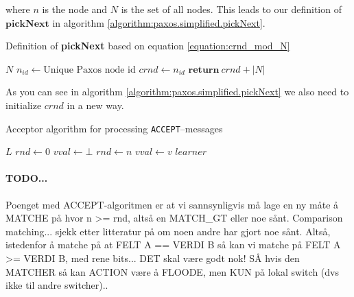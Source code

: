 where $n$ is the node and $N$ is the set of all nodes.  This leads to our
definition of $\textbf{pickNext}$ in algorithm
\ref{algorithm:paxos.simplified.pickNext}.

\begin{algorithm}
  \caption{Definition of \textbf{pickNext} based on equation \ref{equation:crnd_mod_N}}
  \label{algorithm:paxos.simplified.pickNext}
  \begin{algorithmic}
    \State $N$ 
    \State $n_{id} \gets \text{Unique Paxos node id}$
    \State $crnd \gets n_{id}$
    \State
      \State $\textbf{return}\ crnd + |N|$ 
    \EndFunction
  \end{algorithmic}
\end{algorithm}

As you can see in algorithm \ref{algorithm:paxos.simplified.pickNext} we
also need to initialize $crnd$ in a new way.

\begin{algorithm}
  \caption{Acceptor algorithm for processing \texttt{ACCEPT}--messages}
  \label{paxos.algorithm.acceptor}
  \begin{algorithmic}
    \State $L$
    \State $rnd \gets 0$ 
    \State $vval \gets \bot$ 
    \State
        \State $rnd\gets n$
        \State $vval\gets v$
           \State {}
                         {$learner$}
        \EndForIn
      \EndIf
    \EndOn
  \end{algorithmic}
\end{algorithm}

\paragraph{TODO...}

Poenget med ACCEPT-algoritmen er at vi sannsynligvis må lage en ny måte å
MATCHE på hvor n >= rnd, altså en MATCH\_{}GT eller noe sånt.  Comparison
matching... sjekk etter litteratur på om noen andre har gjort noe sånt.
Altså, istedenfor å matche på at FELT A == VERDI B så kan vi matche på FELT
A >= VERDI B, med rene bits... DET skal være godt nok!  SÅ hvis den MATCHER
så kan ACTION være å FLOODE, men KUN på lokal switch (dvs ikke til andre
switcher)..

